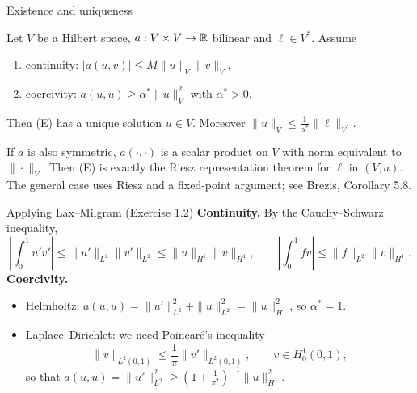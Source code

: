 \begin{frame}{Existence and uniqueness}
    \begin{theorem}
        Let $V$ be a Hilbert space, $a: V\times V \to {\mathbb R}$ bilinear and $\ell \in V^*$. Assume
        \begin{enumerate}
            \item continuity: $|a(u,v)| \le M \|u\|_V \|v\|_V$,
            \item coercivity: $a(u,u) \ge \alpha^* \|u\|_V^2$ with $\alpha^* > 0$.
        \end{enumerate}
        Then \textup{(E)} has a unique solution $u \in V$. Moreover $\|u\|_V \le \frac{1}{\alpha^*}\|\ell\|_{V^*}$.
    \end{theorem}
    \begin{proofsteps}
        If $a$ is also symmetric, $a(\cdot,\cdot)$ is a scalar product on $V$ with norm equivalent to $\|\cdot\|_V$.
        Then \textup{(E)} is exactly the Riesz representation theorem for $\ell$ in $(V, a)$.\\
        The general case uses Riesz and a fixed-point argument; see Brezis, Corollary 5.8.
    \end{proofsteps}
\end{frame}

\begin{frame}{Applying Lax--Milgram (Exercise 1.2)}
    \textbf{Continuity.} By the Cauchy--Schwarz inequality,
    \[
        \left|\int_0^1 u'v'\right| \le \|u'\|_{L^2}\|v'\|_{L^2} \le \|u\|_{H^1}\|v\|_{H^1}, \qquad
        \left|\int_0^1 f v\right| \le \|f\|_{L^2}\|v\|_{H^1}.
    \]
    \textbf{Coercivity.}
    \begin{itemize}
        \item Helmholtz: $a(u,u) = \|u'\|_{L^2}^2 + \|u\|_{L^2}^2 = \|u\|_{H^1}^2$, so $\alpha^* = 1$.
        \item Laplace--Dirichlet: we need Poincaré's inequality
              \[
                  \|v\|_{L^2(0,1)} \le \frac 1 \pi \|v'\|_{L^2(0,1)}, \qquad v \in H^1_0(0,1),
              \]
              so that $a(u,u) = \|u'\|^2_{L^2} \ge \left(1+\frac{1}{\pi^2}\right)^{-1} \|u\|_{H^1}^2$.
    \end{itemize}
\end{frame}


